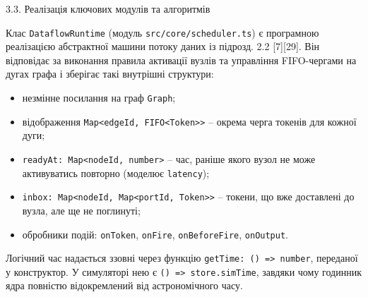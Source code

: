 \documentclass[
]{article}
\newcommand{\passthrough}[1]{#1}
\begin{document}
\protect{}\label{X93404be9f391802071cdb56c883309addb4749a}{}3.3.
Реалізація ключових модулів та алгоритмів

Клас \passthrough{\lstinline!DataflowRuntime!} (модуль
\passthrough{\lstinline!src!}\passthrough{\lstinline!/!}\passthrough{\lstinline!core!}\passthrough{\lstinline!/!}\passthrough{\lstinline!scheduler!}\passthrough{\lstinline!.!}\passthrough{\lstinline!ts!})
є програмною реалізацією абстрактної машини потоку даних із підрозд. 2.2
{[}7{]}{[}29{]}. Він відповідає за виконання правила активації вузлів та
управління FIFO-чергами на дугах графа і зберігає такі внутрішні
структури:

\begin{itemize}
\item
  незмінне посилання на граф \passthrough{\lstinline!Graph!};
\item
  відображення
  \passthrough{\lstinline!Map!}\passthrough{\lstinline!<!}\passthrough{\lstinline!edgeId!}\passthrough{\lstinline!,!}\passthrough{\lstinline! !}\passthrough{\lstinline!FIFO!}\passthrough{\lstinline!<!}\passthrough{\lstinline!Token!}\passthrough{\lstinline!>>!}
  -- окрема черга токенів для кожної дуги;
\item
  \passthrough{\lstinline!readyAt!}\passthrough{\lstinline!:!}\passthrough{\lstinline! !}\passthrough{\lstinline!Map!}\passthrough{\lstinline!<!}\passthrough{\lstinline!nodeId!}\passthrough{\lstinline!,!}\passthrough{\lstinline! !}\passthrough{\lstinline!number!}\passthrough{\lstinline!>!}
  -- час, раніше якого вузол не може активуватись повторно (моделює
  \passthrough{\lstinline!latency!});
\item
  \passthrough{\lstinline!inbox!}\passthrough{\lstinline!:!}\passthrough{\lstinline! !}\passthrough{\lstinline!Map!}\passthrough{\lstinline!<!}\passthrough{\lstinline!nodeId!}\passthrough{\lstinline!,!}\passthrough{\lstinline! !}\passthrough{\lstinline!Map!}\passthrough{\lstinline!<!}\passthrough{\lstinline!portId!}\passthrough{\lstinline!,!}\passthrough{\lstinline! !}\passthrough{\lstinline!Token!}\passthrough{\lstinline!>>!}
  -- токени, що вже доставлені до вузла, але ще не поглинуті;
\item
  обробники подій: \passthrough{\lstinline!onToken!},
  \passthrough{\lstinline!onFire!},
  \passthrough{\lstinline!onBeforeFire!},
  \passthrough{\lstinline!onOutput!}.
\end{itemize}

Логічний час надається ззовні через функцію
\passthrough{\lstinline!getTime!}\passthrough{\lstinline!:!}\passthrough{\lstinline! !}\passthrough{\lstinline!()!}\passthrough{\lstinline! !}\passthrough{\lstinline!=>!}\passthrough{\lstinline! !}\passthrough{\lstinline!number!},
переданої у конструктор. У симуляторі нею є
\passthrough{\lstinline!()!}\passthrough{\lstinline! !}\passthrough{\lstinline!=>!}\passthrough{\lstinline! !}\passthrough{\lstinline!store!}\passthrough{\lstinline!.!}\passthrough{\lstinline!simTime!},
завдяки чому годинник ядра повністю відокремлений від астрономічного
часу.
\end{document}
